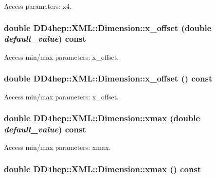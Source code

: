 Access parameters: x4. \hypertarget{struct_d_d4hep_1_1_x_m_l_1_1_dimension_ada6fb7d6c8d3fc8dbdd1ca3f6e919062}{
\subsubsection[{x\_\-offset}]{\setlength{\rightskip}{0pt plus 5cm}double DD4hep::XML::Dimension::x\_\-offset (double {\em default\_\-value}) const}}
\label{struct_d_d4hep_1_1_x_m_l_1_1_dimension_ada6fb7d6c8d3fc8dbdd1ca3f6e919062}


Access min/max parameters: x\_\-offset. \hypertarget{struct_d_d4hep_1_1_x_m_l_1_1_dimension_a648a3e31215a3e8e839b1af4fecc4f94}{
\subsubsection[{x\_\-offset}]{\setlength{\rightskip}{0pt plus 5cm}double DD4hep::XML::Dimension::x\_\-offset () const}}
\label{struct_d_d4hep_1_1_x_m_l_1_1_dimension_a648a3e31215a3e8e839b1af4fecc4f94}


Access min/max parameters: x\_\-offset. \hypertarget{struct_d_d4hep_1_1_x_m_l_1_1_dimension_ab7f08df40c6c910371be2866eda0f81a}{
\subsubsection[{xmax}]{\setlength{\rightskip}{0pt plus 5cm}double DD4hep::XML::Dimension::xmax (double {\em default\_\-value}) const}}
\label{struct_d_d4hep_1_1_x_m_l_1_1_dimension_ab7f08df40c6c910371be2866eda0f81a}


Access min/max parameters: xmax. \hypertarget{struct_d_d4hep_1_1_x_m_l_1_1_dimension_a39e1560dbd3dfb28b71b372fc07ae9a2}{
\subsubsection[{xmax}]{\setlength{\rightskip}{0pt plus 5cm}double DD4hep::XML::Dimension::xmax () const}}
\label{struct_d_d4hep_1_1_x_m_l_1_1_dimension_a39e1560dbd3dfb28b71b372fc07ae9a2}


